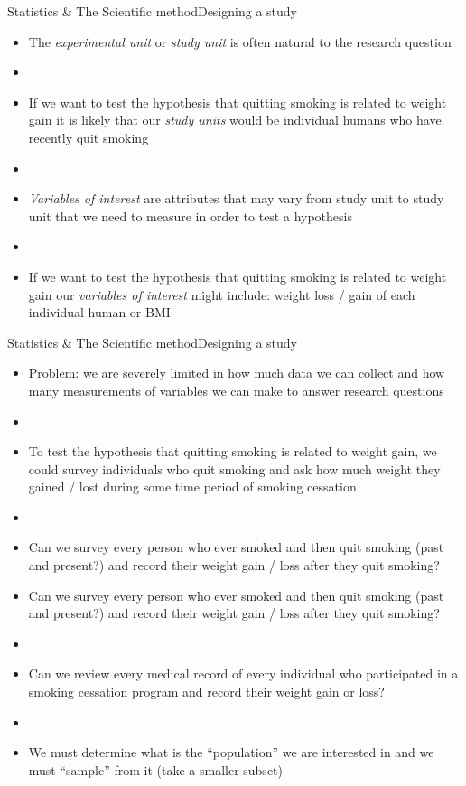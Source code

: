 \documentclass[xcolor=dvipsnames]{beamer}
\begin{document}
\begin{frame}{Statistics \& The Scientific method}{Designing a study}
	\vspace{-12pt}
	\begin{itemize}
		\item The \emph{experimental unit} or \emph{study unit} is often natural to the research question 
		\item[]
		\item If we want to test the hypothesis that quitting smoking is related to weight gain it is likely that our \emph{study units} would be individual humans who have recently quit smoking
		\item[]
		\item \emph{Variables of interest} are attributes that may vary from study unit to study unit that we need to measure in order to test a hypothesis
		\item[]
		\item If we want to test the hypothesis that quitting smoking is related to weight gain our \emph{variables of interest} might include: weight loss / gain of each individual human or BMI
	\end{itemize}
\end{frame}

\begin{frame}{Statistics \& The Scientific method}{Designing a study}
	\vspace{-12pt}
	\begin{itemize}
		\item Problem: we are severely limited in how much data we can collect and how many measurements of variables we can make to answer research questions
		\item[]
		\item To test the hypothesis that quitting smoking is related to weight gain, we could survey individuals who quit smoking and ask how much weight they gained / lost during some time period of smoking cessation
		\item[]
		\item Can we survey every person who ever smoked and then quit smoking (past and present?) and record their weight gain / loss after they quit smoking?
	\end{itemize}
\end{frame}

\begin{frame}
	\begin{itemize}
		\item Can we survey every person who ever smoked and then quit smoking (past and present?) and record their weight gain / loss after they quit smoking?
		\item[]
		\item Can we review every medical record of every individual who participated in a smoking cessation program and record their weight gain or loss?
		\item[]
		\item We must determine what is the ``population'' we are interested in and we must “sample” from it (take a smaller subset)
	\end{itemize}
\end{frame}
\end{document}
